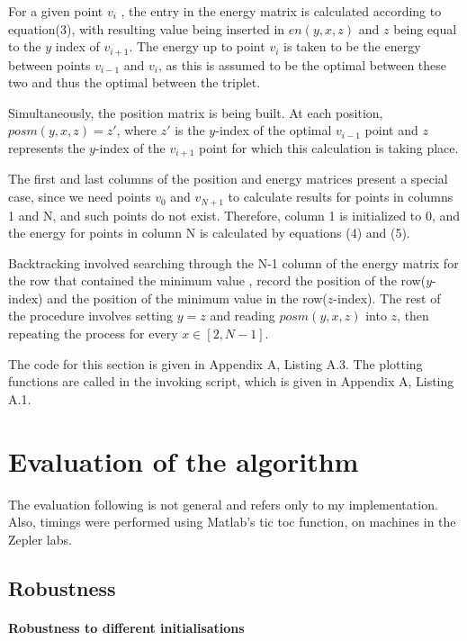 \documentclass[12pt,onecolumn,a4paper]{report}
\begin{document}
For a given point $v_i$ , the entry in the energy matrix is calculated according to equation(3), with resulting value being inserted in $en(y,x,z)$ and $z$ being equal to the $y$ index of $v_{i+1}$. The energy up to point $v_i$ is taken to be the energy between points $v_{i-1}$ and $v_i$, as this is assumed to be the optimal between these two and thus the optimal between the triplet.

Simultaneously, the position matrix is being built. At each position, $posm(y,x,z)= z' $, where $z'$ is the $y$-index of the optimal $v_{i-1}$ point and $z$ represents the $y$-index of the $v_{i+1}$ point for which this calculation is taking place.

The first and last columns of the position and energy matrices present a special case, since we need points $v_0$ and $v_{N+1}$ to calculate results for points in columns 1 and N, and such points do not exist. Therefore, column 1 is initialized to 0,  and the energy for points in column N is calculated by equations (4) and (5).

Backtracking involved searching through the N-1 column of the energy matrix for the row that contained the minimum value , record the position of the row($y$-index) and the position of the minimum value in the row($z$-index). The rest of the procedure involves setting $y=z$ and reading $posm(y,x,z)$ into  $z$, then repeating the process for every $x \in [2,N-1]$.

The code for this section is given in Appendix A, Listing A.3. The plotting functions are called in the invoking script, which is given in Appendix A, Listing A.1.

\section{Evaluation of the algorithm}
The evaluation following is not general and refers only to my implementation. Also, timings were performed using Matlab's {\pica tic toc} function, on machines in the Zepler labs.

\subsection{Robustness}
\paragraph{Robustness to different initialisations }
\end{document}
